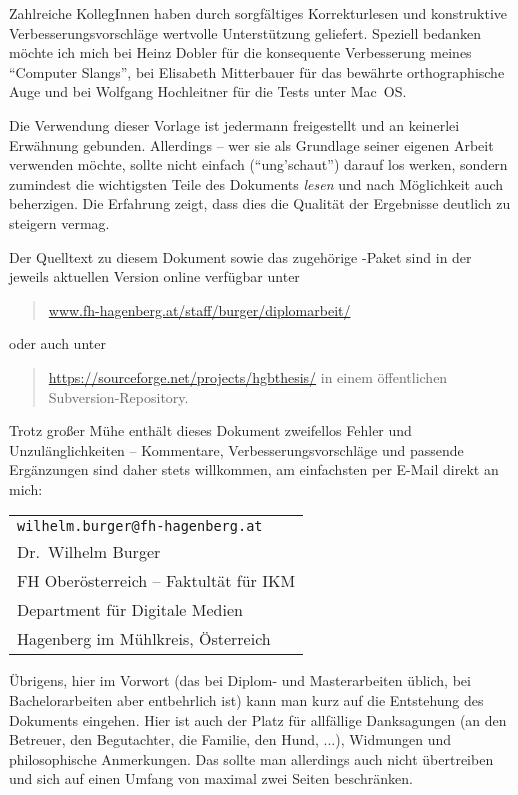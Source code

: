 Zahlreiche KollegInnen haben durch sorgfältiges Korrekturlesen und
konstruktive Verbesserungsvorschläge wertvolle Unterstützung
geliefert. Speziell bedanken möchte ich mich bei Heinz Dobler für
die konsequente Verbesserung meines "`Computer Slangs"', bei
Elisabeth Mitterbauer für das bewährte orthographische Auge und
bei Wolfgang Hochleitner für die Tests unter Mac~OS.

Die Verwendung dieser Vorlage ist jedermann freigestellt und an
keinerlei Erwähnung gebunden. Allerdings -- wer sie als Grundlage
seiner eigenen Arbeit verwenden möchte, sollte nicht einfach
("`ung'schaut"') darauf los werken, sondern zumindest die
wichtigsten Teile des Dokuments \emph{lesen} und nach Möglichkeit
auch beherzigen. Die Erfahrung zeigt, dass dies die Qualität der
Ergebnisse deutlich zu steigern vermag.

Der Quelltext zu diesem Dokument sowie das zugehörige
\latex-Paket sind in der jeweils aktuellen Version online
verfügbar unter
%
\begin{quote}
\url{www.fh-hagenberg.at/staff/burger/diplomarbeit/}
\end{quote}
%
oder auch unter
%
\begin{quote}
\url{https://sourceforge.net/projects/hgbthesis/} \newline
in einem öffentlichen Subversion-Repository.
\end{quote}
%
Trotz großer Mühe enthält dieses Dokument zweifellos Fehler und Unzulänglichkeiten
-- Kommentare, Verbesserungsvorschläge und passende Ergänzungen
sind daher stets willkommen, am einfachsten per E-Mail direkt an mich:
\begin{center}%
\begin{tabular}{l}
\nolinkurl{wilhelm.burger@fh-hagenberg.at} \\
Dr.\ Wilhelm Burger \\
FH Oberösterreich -- Faktultät für IKM\\
Department für Digitale Medien\\
Hagenberg im Mühlkreis, Österreich
\end{tabular}
\end{center}

\noindent
Übrigens, hier im Vorwort (das bei Diplom- und Masterarbeiten üblich, bei Bachelorarbeiten 
aber entbehrlich ist) kann man kurz auf die Entstehung  des Dokuments eingehen.
Hier ist auch der Platz für allfällige Danksagungen (\zB an den Betreuer, 
den Begutachter, die Familie, den Hund, ...), Widmungen und philosophische 
Anmerkungen. Das sollte man allerdings auch nicht übertreiben und sich auf 
einen Umfang von maximal zwei Seiten beschränken.




